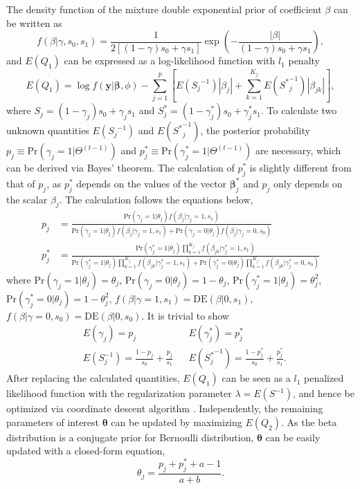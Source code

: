 \documentclass[AMA,STIX1COL,]{WileyNJD-v2}
\begin{document}
The density function of the mixture double exponential prior of
coefficient \(\beta\) can be written as \[
f(\beta|\gamma, s_0, s_1) = \frac{1}{2\left[(1-\gamma)s_0 + \gamma s_1\right]}\exp(-\frac{|\beta|}{(1-\gamma)s_0 + \gamma s_1}),
\] and \(E(Q_1)\) can be expressed as a log-likelihood function with
\(l_1\) penalty \begin{equation}\label{eq:Q1_CD}
E(Q_1) = \log f(\textbf{y}|\boldsymbol{\beta}, \phi) - \sum\limits_{j=1}^p\left[E({S_j}^{-1})|\beta_j|+\sum\limits_{k=1}^{K_j}E({S^{*}}^{-1}_{j})|\beta_{jk}|\right],
\end{equation} where \(S_{j} = (1-\gamma_{j}) s_0 + \gamma_{j} s_1\) and
\(S^*_{j} = (1-\gamma^*_{j}) s_0 + \gamma^*_{j} s_1\). To calculate two
unknown quantities \(E({S_j}^{-1})\) and \(E({S^*}^{-1}_j)\), the
posterior probability
\(p_{j} \equiv \text{Pr}(\gamma_{j}=1|\Theta^{(t-1)})\) and
\(p_{j}^*\equiv \text{Pr}(\gamma^*_{j}=1|\Theta^{(t-1)})\) are
necessary, which can be derived via Bayes' theorem. The calculation of
\(p_j^*\) is slightly different from that of \(p_j\), as \(p_j^*\)
depends on the values of the vector \(\boldsymbol{\beta}^*_{j}\) and
\(p_j\) only depends on the scalar \(\beta_j\). The calculation follows
the equations below, \begin{align*}
p_{j} &= \frac{\text{Pr}(\gamma_{j} = 1|\theta_j)f(\beta_{j}|\gamma_{j}=1, s_1) }{\text{Pr}(\gamma_{j} = 1|\theta_j)f(\beta_{j}|\gamma_{j}=1, s_1) + \text{Pr}(\gamma_{j} = 0|\theta_j)f(\beta_{j}|\gamma_{j}=0, s_0)}\\
p^*_{j} &= \frac{\text{Pr}(\gamma^{*}_{j} = 1|\theta_j)\prod\limits_{k=1}^{K_j}f(\beta_{jk}|\gamma^{*}_{j}=1, s_1) }{\text{Pr}(\gamma^{*}_{j} = 1|\theta_j)\prod\limits_{k=1}^{K_j}f(\beta_{jk}|\gamma^{*}_{j}=1, s_1) + \text{Pr}(\gamma^{*}_{j} = 0|\theta_j)\prod\limits_{k=1}^{K_j}f(\beta_{jk}|\gamma^{*}_{j}=0, s_0)}
\end{align*} where \(\text{Pr}(\gamma_{j} = 1|\theta_j) = \theta_j\),
\(\text{Pr}(\gamma_{j} = 0|\theta_j) = 1-\theta_j\),
\(\text{Pr}(\gamma_{j}^*= 1|\theta_j) = \theta_j^2\),
\(\text{Pr}(\gamma_{j}^*= 0|\theta_j) = 1-\theta^2_j\),
\(f(\beta|\gamma=1, s_1) = \text{DE}(\beta|0 , s_1)\),
\(f(\beta|\gamma=0, s_0) = \text{DE}(\beta|0 , s_0)\). It is trivial to
show \begin{align*}\label{eq:exp_scale}
&E(\gamma_{j})  = p_{j} & &E(\gamma^{*}_{j}) = p_{j}^{*}\nonumber\\
&E({S}^{-1}_{j}) = \frac{1-p_{j}}{s_0} + \frac{p_{j}}{s_1} & &E({S_{j}^*}^{-1}) = \frac{1-p_{j}^{*}}{s_0} + \frac{p_{j}^{*}}{s_1}.
\end{align*} After replacing the calculated quantities, \(E(Q_1)\) can
be seen as a \(l_1\) penalized likelihood function with the
regularization parameter \(\lambda = E(S^{-1})\), and hence be optimized
via coordinate descent algorithm \citep{Friedman2010}. Independently,
the remaining parameters of interest \(\boldsymbol{\theta}\) can be
updated by maximizing \(E(Q_2)\). As the beta distribution is a
conjugate prior for Bernoulli distribution, \(\boldsymbol{\theta}\) can
be easily updated with a closed-form equation,
\begin{equation}\label{eq:update_theta}
\theta_j = \frac{p_j + p^*_{j} + a - 1 }{a + b}.
\end{equation}
\end{document}
